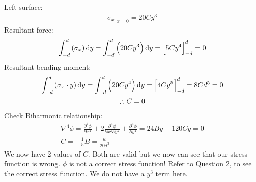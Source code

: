 \documentclass[11pt]{article}
\numberwithin{equation}{section}
\begin{document}
Left surface:
\begin{gather}
    \left. \sigma_{x} \right|_{x=0} = 20Cy^3
\end{gather}
Resultant force:
\begin{gather}
    \int_{-d}^d \left(\sigma_x\right)\dif y = \int^d_{-d} \left(20Cy^3\right)\dif y = \left[5Cy^4\right]^d_{-d}= 0
\end{gather}
Resultant bending moment:
\begin{gather}
    \int_{-d}^d \left(\sigma_x \cdot y \right)\dif y =\int_{-d}^d \left(20Cy^4\right)\dif y = \left[4Cy^5\right]_{-d}^d = 8Cd^5 = 0\\
    \therefore C = 0
\end{gather}
Check Biharmonic relationship:
\begin{gather}
    \nabla^4 \phi = \frac{\partial^4 \phi}{\partial x^4} + 2\frac{\partial^4\phi}{\partial x^2 \partial y^2} + \frac{\partial^4 \phi}{\partial y^4} = 24By + 120Cy = 0\\
    C = -\frac{1}{5} B = \frac{w}{20d^3}
\end{gather}
We now have 2 values of $C$. Both are valid but we now can see that our stress function is wrong. $\phi$ is not a correct stress function! Refer to Question 2, to see the correct stress function. We do not have a $y^3$ term here.
\end{document}
